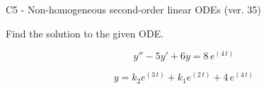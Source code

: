 \begin{exercise}
  \begin{exerciseTitle}C5 - Non-homogeneous second-order linear ODEs (ver. 35)\end{exerciseTitle}
  \begin{exerciseStatement}
    
Find the solution to the given ODE.

    
\[y''-5y'+6y = 8 \, e^{\left(4 \, t\right)}\]

  \end{exerciseStatement}
  \begin{exerciseAnswer}
    
\[y= k_{2} e^{\left(3 \, t\right)} + k_{1} e^{\left(2 \, t\right)} + 4 \, e^{\left(4 \, t\right)}\]

  \end{exerciseAnswer}
\end{exercise}